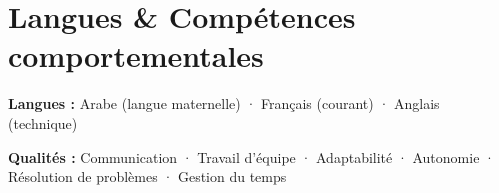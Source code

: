 \section{Langues \& Compétences comportementales}
    \vspace{0.2em}
    \textbf{Langues : }Arabe (langue maternelle) · Français (courant) · Anglais (technique)

    \vspace{0.2em}
    \textbf{Qualités : }Communication · Travail d'équipe · Adaptabilité · Autonomie · Résolution de problèmes · Gestion du temps
